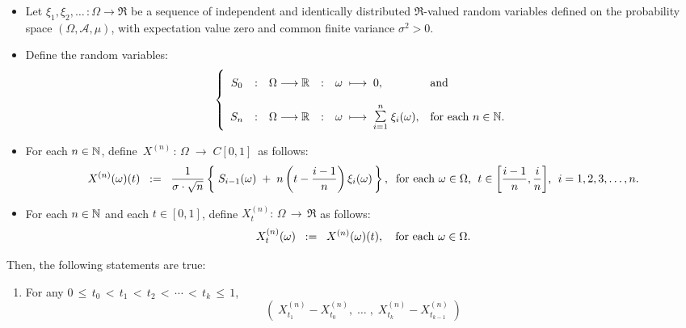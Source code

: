 \begin{theorem}
\label{multivariateGaussianScalingLimit}
\mbox{}\vskip 0cm
\begin{itemize}
\item	Let $\xi_{1}, \xi_{2}, \ldots\, : \Omega \longrightarrow \Re$ be a sequence of
		independent and identically distributed $\Re$-valued random variables
		defined on the probability space $(\Omega,\mathcal{A},\mu)$,
		with expectation value zero and common finite variance $\sigma^{2} > 0$.
\item	Define the random variables:
		\begin{equation*}
		\left\{\begin{array}{ccccll}
		S_{0}
		&:&\overset{{\color{white}1}}{\Omega} \longrightarrow \Re
		&:& \omega \;\longmapsto\; 0,
		& \textnormal{and}
		\\ \\
		S_{n}
		&:&	\Omega \longrightarrow \Re
		&:&	\omega \;\longmapsto\; \overset{n}{\underset{i=1}{\textnormal{\Large$\sum$}}}\;\xi_{i}(\omega),
		& \textnormal{for each $n \in \N$}.
		\end{array}\right.
		\end{equation*}
\item	For each $n \in \mathbb{N}$, define \,$X^{(n)} \,:\, \Omega \;\longrightarrow\;C[0,1]$\, as follows:
		\begin{equation*}
		X^{(n)}(\omega)(t)
		\;\; := \;\;
		\dfrac{1}{\sigma\cdot\sqrt{n}}
		\left\{\;
		S_{i-1}(\omega) \;+\; n\left(t - \dfrac{i-1}{n}\right)\xi_{i}(\omega)
		\,\right\},
		\;\;
		\textnormal{for each $\omega \in \Omega$, \;$t \in \left[\frac{i-1}{n},\frac{i}{n}\right]$, \;$i = 1,2,3,\ldots,n$}.
		\end{equation*}
\item	For each $n \in \mathbb{N}$ and each $t \in [0,1]$, define
		\;$X^{(n)}_{t} : \,\Omega \, \longrightarrow \, \Re$\;
		as follows:
		\begin{equation*}
		X^{(n)}_{t}(\omega) \;\; := \;\; X^{(n)}(\omega)(t),
		\quad
		\textnormal{for each $\omega \in \Omega$}.
		\end{equation*}
\end{itemize}
Then, the following statements are true:
\begin{enumerate}
\item	For any \;$0 \,\leq\, t_{0} \,<\, t_{1} \,<\, t_{2} \,<\, \cdots \,<\, t_{k} \,\leq\, 1$,
		\begin{equation*}
		\left(\;X^{(n)}_{t_{1}} - X^{(n)}_{t_{0}}, \;\ldots\;,\; X^{(n)}_{t_{k}} - X^{(n)}_{t_{k-1}}\;\right)

\end{equation*}
\end{enumerate}
\end{theorem}
